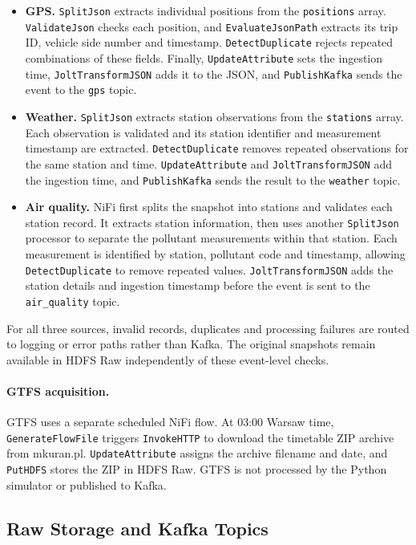 \documentclass[11pt]{article}
\begin{document}
\begin{itemize}\sloppy
    \item \textbf{GPS.} \texttt{SplitJson} extracts individual positions from the \texttt{positions} array. \texttt{ValidateJson} checks each position, and \texttt{EvaluateJsonPath} extracts its trip ID, vehicle side number and timestamp. \texttt{DetectDuplicate} rejects repeated combinations of these fields. Finally, \texttt{UpdateAttribute} sets the ingestion time, \texttt{JoltTransformJSON} adds it to the JSON, and \texttt{PublishKafka} sends the event to the \texttt{gps} topic.
    \item \textbf{Weather.} \texttt{SplitJson} extracts station observations from the \texttt{stations} array. Each observation is validated and its station identifier and measurement timestamp are extracted. \texttt{DetectDuplicate} removes repeated observations for the same station and time. \texttt{UpdateAttribute} and \texttt{JoltTransformJSON} add the ingestion time, and \texttt{PublishKafka} sends the result to the \texttt{weather} topic.
    \item \textbf{Air quality.} NiFi first splits the snapshot into stations and validates each station record. It extracts station information, then uses another \texttt{SplitJson} processor to separate the pollutant measurements within that station. Each measurement is identified by station, pollutant code and timestamp, allowing \texttt{DetectDuplicate} to remove repeated values. \texttt{JoltTransformJSON} adds the station details and ingestion timestamp before the event is sent to the \texttt{air\_quality} topic.
\end{itemize}

For all three sources, invalid records, duplicates and processing failures are routed to logging or error paths rather than Kafka. The original snapshots remain available in HDFS Raw independently of these event-level checks.

\paragraph{GTFS acquisition.}
GTFS uses a separate scheduled NiFi flow. At 03:00 Warsaw time, \texttt{GenerateFlowFile} triggers \texttt{InvokeHTTP} to download the timetable ZIP archive from mkuran.pl. \texttt{UpdateAttribute} assigns the archive filename and date, and \texttt{PutHDFS} stores the ZIP in HDFS Raw. GTFS is not processed by the Python simulator or published to Kafka.

\subsection{Raw Storage and Kafka Topics}
\end{document}
